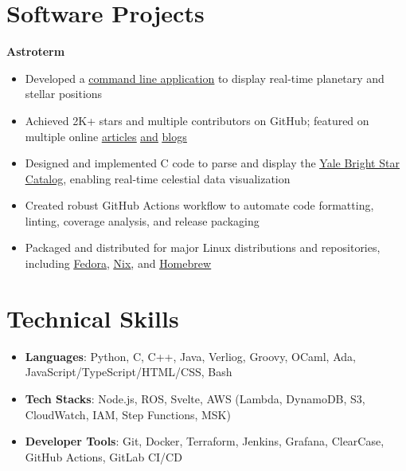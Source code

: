 \documentclass[letterpaper,10pt]{article}
\newcommand{\itemsBegin}{
    \begin{itemize}[leftmargin=0.2in, labelsep=0.05in, itemsep=0pt, parsep=1pt, topsep=0pt, partopsep=0pt]
    \small
}
\newcommand{\itemsEnd}{\end{itemize}}
\begin{document}
\section{Software Projects}

    \normalsize \textbf{Astroterm}

    \itemsBegin{}
        \item Developed a
        \href{https://github.com/da-luce/astroterm}{\underline{command line application}}
        to display real-time planetary and stellar positions
        \item Achieved 2K+ stars and multiple contributors on GitHub; featured on multiple online
        \href{https://www.linuxlinks.com/astroterm-terminal-based-star-map/}{\underline{articles}}
        \href{https://github.com/toolleeo/awesome-cli-apps-in-a-csv?tab=readme-ov-file#graphics}{\underline{and}}
        \href{https://terminaltrove.com/astroterm/}{\underline{blogs}}
        \item Designed and implemented C code to parse and display the
        \href{https://tdc-www.harvard.edu/catalogs/bsc5.html}{\underline{Yale Bright Star Catalog}},
        enabling real-time celestial data visualization
        \item Created robust GitHub Actions workflow to automate code formatting, linting, coverage analysis, and release packaging
        \item Packaged and distributed for major Linux distributions and repositories, including
        \href{https://packages.fedoraproject.org/pkgs/astroterm/astroterm/index.html}{\underline{Fedora}},
        \href{https://search.nixos.org/packages?channel=unstable&show=astroterm&from=0&size=50&sort=relevance&type=packages&query=astroterm}{\underline{Nix}}, and
        \href{https://formulae.brew.sh/formula/astroterm#default}{\underline{Homebrew}}
    \itemsEnd{}

\section{Technical Skills}

    \itemsBegin{}
        \item \textbf{Languages}{: Python, C, C++, Java, Verliog, Groovy, OCaml, Ada, JavaScript/TypeScript/HTML/CSS, Bash}
        \item \textbf{Tech Stacks}{: Node.js, ROS, Svelte, AWS (Lambda, DynamoDB, S3, CloudWatch, IAM, Step Functions, MSK)}
        \item \textbf{Developer Tools}{: Git, Docker, Terraform, Jenkins, Grafana, ClearCase, GitHub Actions, GitLab CI/CD }
    \itemsEnd{}
\end{document}
